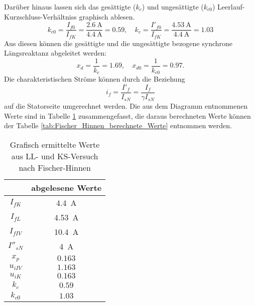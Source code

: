 Darüber hinaus lassen sich das gesättigte ($k_ {c}$) und ungesättigte ($k_ {c0}$) Leerlauf-Kurzschluss-Verhältniss graphisch ablesen.
\begin{equation*}
    k_ {c0} = \frac{I_{f0}}{I_{fK}} = \frac{\SI{2.6}{\ampere}}{\SI{4.4}{\ampere}} = 0.59, \quad k_ {c} = \frac{I'_{f0}}{I_{fK}} = \frac{\SI{4.53}{\ampere}}{\SI{4.4}{\ampere}} = 1.03
\end{equation*}
Aus diesen können die gesättigte und die ungesättigte bezogene synchrone Längsreaktanz abgeleitet werden:
\begin{equation*}
    x_d = \frac{1}{k_c} = 1.69, \quad x_{d0} = \frac{1}{k_{c0}} = 0.97.
\end{equation*}
Die charakteristischen Ströme können durch die Beziehung
\begin{equation*}
    i_f = \frac{I'_f}{I_{sN}} = \frac{I_f}{\gamma I_{sN}}
\end{equation*}
auf die Statorseite umgerechnet werden. Die aus dem Diagramm entnommenen Werte sind in Tabelle \ref{tab:Fischer_Hinnen_abgelesene_Werte} zusammengefasst, die daraus berechneten Werte können der Tabelle \ref{tab:Fischer_Hinnen_berechnete_Werte} entnommen werden.

\begin{table}[!ht]
\centering
\begin{tabular}{|c|c|}
\hline
            & abgelesene Werte      \\ \hline
$I_{fK}$    &  \SI{4.4}{\ampere}    \\ \hline
$I_{fL}$    & \SI{4.53}{\ampere}    \\ \hline
$I_{fIV}$   & \SI{10.4}{\ampere}    \\ \hline
$I''_{sN}$  & \SI{4}{\ampere}       \\ \hline
$x_p$       & $0.163$               \\ \hline
$u_{iIV}$   & $1.163$               \\ \hline
$u_{iK}$    & $0.163$               \\ \hline
$k_c$       & $0.59$                \\ \hline
$k_{c0}$    & $1.03$                \\ \hline
\end{tabular}
\caption{Grafisch ermittelte Werte aus LL- und KS-Versuch nach Fischer-Hinnen}
\label{tab:Fischer_Hinnen_abgelesene_Werte}
\end{table}

